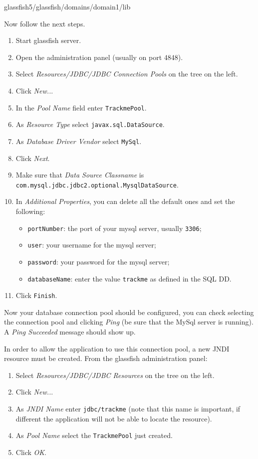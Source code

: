 \begin{center}
glassfish5/glassfish/domains/domain1/lib 
\end{center}
Now follow the next steps.
\begin{enumerate}
\item Start glassfish server.
\item Open the administration panel (usually on port 4848).
\item Select \textit{Resources/JDBC/JDBC Connection Pools} on the tree on the left.
\item Click \textit{New..}.
\item In the \textit{Pool Name} field enter \texttt{TrackmePool}.
\item As \textit{Resource Type} select \texttt{javax.sql.DataSource}.
\item As \textit{Database Driver Vendor} select \texttt{MySql}.
\item Click \textit{Next}.
\item Make sure that \textit{Data Source Classname} is \texttt{com.mysql.jdbc.jdbc2.optional.MysqlDataSource}.
\item In \textit{Additional Properties}, you can delete all the default ones and set the following:
	\begin{itemize}
	\item \texttt{portNumber}: the port of your mysql server, usually \texttt{3306};
	\item \texttt{user}: your username for the mysql server;
	\item	\texttt{password}: your password for the mysql server;
	\item \texttt{databaseName}: enter the value \texttt{trackme} as defined in the SQL DD.
	\end{itemize}
\item Click \texttt{Finish}.
\end{enumerate}

Now your database connection pool should be configured, you can check selecting the connection pool and clicking \textit{Ping} (be sure that the MySql server is running).
A \textit{Ping Succeeded} message should show up.\vspace{1em}


\noindent
In order to allow the application to use this connection pool, a new JNDI resource must be created.
From the glassfish administration panel:

\begin{enumerate}
\item Select \textit{Resources/JDBC/JDBC Resources} on the tree on the left.
\item Click \textit{New..}.
\item As \textit{JNDI Name} enter \texttt{jdbc/trackme} (note that this name is important, if different the application will not be able to locate the resource).
\item As \textit{Pool Name} select the \texttt{TrackmePool} just created.
\item Click \textit{OK}.
\end{enumerate}


